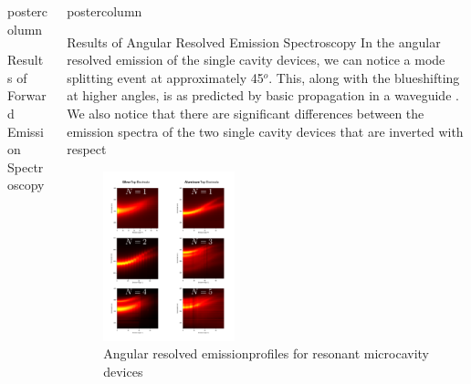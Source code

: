 \documentclass[papersize={24in,36in}]{beamer}
\newlength{\columnheight}
\begin{document}
\begin{frame}
\begin{columns}
\begin{column}{.49\textwidth}
\begin{beamercolorbox}[center,wd=\textwidth]{postercolumn}
\begin{minipage}[T]{.95\textwidth}
{\begin{block}{Results of Forward Emission Spectroscopy}
            \end{block}
			\vspace{2cm}
          }
        \end{minipage}
      \end{beamercolorbox}
    \end{column}
    \begin{column}{.49\textwidth}
      \begin{beamercolorbox}[center,wd=\textwidth]{postercolumn}
        \begin{minipage}[T]{.95\textwidth} %
          \parbox[t][\columnheight]{\textwidth}{
			\vspace{2cm}
            \begin{block}{Results of Angular Resolved Emission Spectroscopy}
				In the angular resolved emission of the single cavity devices, we can notice a mode splitting event at approximately 45$^o$. This, along with the blueshifting at higher angles, is as predicted by basic propagation in a waveguide \cite{Stavrinou1999}. We also notice that there are significant differences between the emission spectra of the two single cavity devices that are inverted with respect
				\begin{figure}
					\includegraphics[width=0.4\textwidth]{images/DFDG_Summary.pdf}
					\caption{ Angular resolved emission\newline profiles for resonant microcavity devices}
				\end{figure}

\end{block}}
\end{minipage}
\end{beamercolorbox}
\end{column}
\end{columns}
\end{frame}
\end{document}
